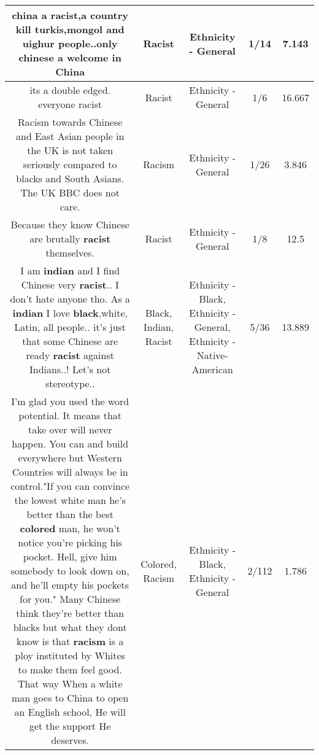 \documentclass[11pt]{article}
\newlength\mylength
\begin{document}
\begin{center}
\begin{longtable}{|C{.65\mylength}|C{.30\mylength}|C{.12\mylength}|C{.12\mylength}|C{.12\mylength}|}
  \small china a \textbf{racist},a country kill turkis,mongol and uighur people..only chinese a welcome in China\normalsize   & Racist & Ethnicity - General & 1/14 & 7.143 \\  \hline
  \small its a double edged. everyone racist\normalsize   & Racist & Ethnicity - General & 1/6 & 16.667 \\  \hline
  \small Racism towards Chinese and East Asian people in the UK is not taken seriously compared to blacks and South Asians. The UK BBC does not care.\normalsize   & Racism & Ethnicity - General & 1/26 & 3.846 \\  \hline
  \small Because they know Chinese are brutally \textbf{racist} themselves.\normalsize   & Racist & Ethnicity - General & 1/8 & 12.5 \\  \hline
  \small I am \textbf{indian} and I find Chinese very \textbf{racist}.. I don't hate anyone tho. As a \textbf{indian} I love \textbf{black},white, Latin, all people.. it's just that some Chinese are ready \textbf{racist} against Indians..! Let's not stereotype..\normalsize   & Black, Indian, Racist & Ethnicity - Black, Ethnicity - General, Ethnicity - Native-American & 5/36 & 13.889 \\  \hline
  \small {} I'm glad you used the word potential. It means that take over will never happen. You can and build everywhere but Western Countries will always be in control."If you can convince the lowest white man he's better than the best \textbf{colored} man, he won't notice you're picking his pocket. Hell, give him somebody to look down on, and he'll empty his pockets for you." Many Chinese think they're better than blacks but what they dont know is that \textbf{racism} is a ploy instituted by Whites to make them feel good. That way When a white man goes to China to open an English school, He will get the support He deserves.\normalsize   & Colored, Racism & Ethnicity - Black, Ethnicity - General & 2/112 & 1.786 \\  \hline

\end{longtable}
\end{center}
\end{document}
